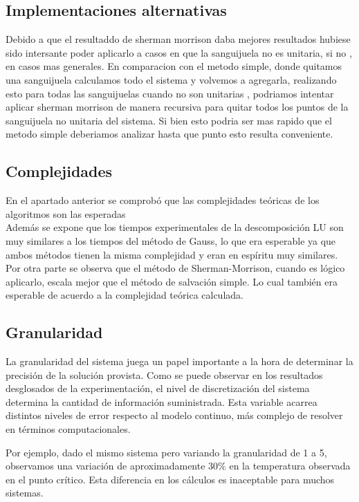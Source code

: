 
\subsection{Implementaciones alternativas}
Debido a que el resultaddo de sherman morrison daba mejores resultados hubiese sido intersante poder aplicarlo a casos en que la sanguijuela no es unitaria, si no , en casos mas generales. En comparacion con el metodo simple, donde quitamos una sanguijuela calculamos todo el sistema y volvemos a agregarla, realizando esto para todas las sanguijuelas cuando no son unitarias , podriamos intentar aplicar sherman morrison de manera recursiva para quitar todos los puntos de la sanguijuela no unitaria del sistema. Si bien esto podria ser mas rapido que el metodo simple deberiamos analizar hasta que punto esto resulta conveniente.

\subsection{Complejidades}
En el apartado anterior se comprobó que las complejidades teóricas de los algoritmos son las esperadas 
\\
Además se expone que los tiempos experimentales de la descomposición LU son muy similares a los tiempos del método de Gauss, lo que era esperable ya que ambos métodos tienen la misma complejidad y eran en espíritu muy similares.
\\
Por otra parte se observa que el método de Sherman-Morrison, cuando es lógico aplicarlo, escala mejor que el método de salvación simple. Lo cual también era esperable de acuerdo a la complejidad teórica calculada.

\subsection{Granularidad}

La granularidad del sistema juega un papel importante a la hora de determinar la precisión de la solución provista.
Como se puede observar en los resultados desglosados de la experimentación, el nivel de discretización del sistema
determina la cantidad de información suministrada. Esta variable acarrea distintos niveles de error respecto al modelo continuo,
más complejo de resolver en términos computacionales.

Por ejemplo, dado el mismo sistema pero variando la granularidad de 1 a 5, observamos una variación de aproximadamente $30\%$ en la
temperatura observada en el punto crítico. Esta diferencia en los cálculos es inaceptable para muchos sistemas.


